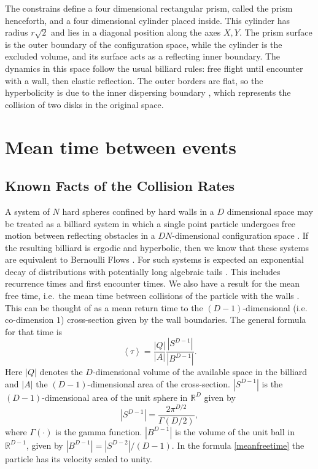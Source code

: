 \documentclass[letterpaper,10pt, jcp, aps]{revtex4-1}
\newcommand{\mean}[1]{\left \langle #1 \right \rangle}
\newcommand{\RR}{\mathbb{R}}
\begin{document}
The constrains define a four dimensional
rectangular prism, called the prism henceforth,   
and a four dimensional cylinder placed inside.
This cylinder has radius $r\sqrt{2}$ and lies
in  a diagonal position along the axes $X, Y$.
The prism surface is the outer boundary of the configuration space,
while the cylinder is the excluded volume, and its surface
acts as a reflecting inner boundary.
The dynamics in this space follow
the usual billiard rules: free flight until
encounter with a wall, then elastic reflection.
The outer borders are flat, so the
hyperbolicity is due to the inner dispersing
boundary \cite{Sim99}, which represents the collision of
two disks in the original space.


\section{Mean time between events}


\subsection{Known Facts of the Collision Rates}

A system of $N$ hard spheres confined by hard walls in a $D$ dimensional
space may be treated as a billiard system 
in which a single point  particle undergoes free motion between reflecting obstacles 
in a $ D N $-dimensional configuration space \cite{Sinai70, Sim99, MarkChern}. 
If the resulting billiard is ergodic and hyperbolic, then we know that
these systems are equivalent to Bernoulli Flows \cite{Gallavotti74}.
For such systems is expected an exponential decay of 
distributions \cite{AbadiGalves} with potentially
long algebraic tails \cite{ZasTip}. 
This includes recurrence times and
first encounter times. We also
have a result for the mean free time, i.e.\ the mean time between 
collisions of the particle with the walls \cite{MarkChern}. 
This can be thought of as a mean return time to the $(D-1)$-dimensional 
(i.e. co-dimension $1$) cross-section given by the wall boundaries.
The general formula for that time is
\begin{equation}\label{meanfreetime}
 \mean{\tau} = \frac{|Q|}{|A|} \frac{|S^{D-1}|}{|B^{D-1}|}.
\end{equation}
Here $|Q|$ denotes the $D$-dimensional volume of the available 
space in the billiard and 
$|A|$ the $(D-1)$-dimensional area of the cross-section.
 $|S^{D-1}|$ is the $(D-1)$-dimensional area of the unit sphere in $\RR^D$ given by
\begin{equation}
  |S^{D-1}| = \frac{2 \pi^{D/2}}{\Gamma(D/2)},
\end{equation}
where $\Gamma(\cdot)$ is the gamma function. 
$|B^{D-1}|$ is the volume of the unit ball 
in $\RR^{D-1}$, given by $|B^{D-1}| = |S^{D-2}| / (D-1)$.
In the formula \ref{meanfreetime}  the particle has 
its velocity scaled to unity.
\end{document}
